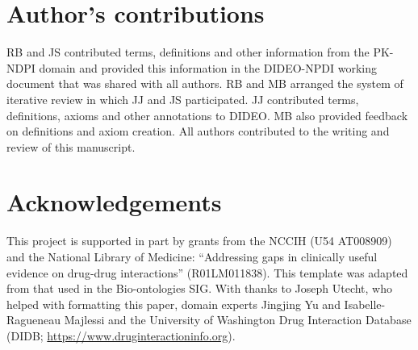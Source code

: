 \documentclass{bmcart}
\begin{document}
\begin{backmatter}

\section*{Author's contributions}
RB and JS contributed terms, definitions and other information from the PK-NDPI domain and provided this information in the DIDEO-NPDI working document that was shared with all authors.
RB and MB arranged the system of iterative review in which JJ and JS participated.
JJ contributed terms, definitions, axioms and other annotations to DIDEO.
MB also provided feedback on definitions and axiom creation.
All authors contributed to the writing and review of this manuscript.

\section*{Acknowledgements}
This project is supported in part by grants from the NCCIH (U54 AT008909) and the National Library of Medicine: “Addressing gaps in clinically useful evidence on drug-drug interactions” (R01LM011838).
This template was adapted from that used in the Bio-ontologies SIG.
With thanks to Joseph Utecht, who helped with formatting this paper, domain experts Jingjing Yu and Isabelle-Ragueneau Majlessi and the University of Washington Drug Interaction Database (DIDB; \url{https://www.druginteractioninfo.org}).



\end{backmatter}
\end{document}
